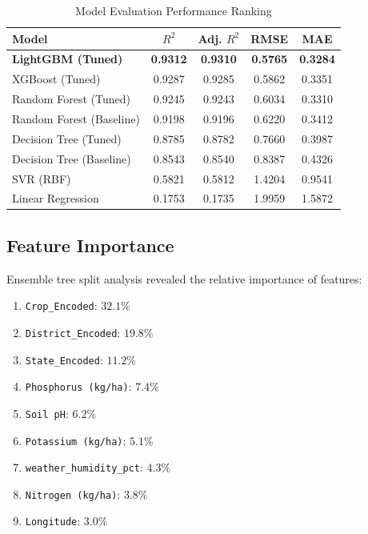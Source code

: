 \documentclass[11pt,a4paper]{article}
\begin{document}
\begin{table}[H]
\caption{Model Evaluation Performance Ranking}
\label{tab:model_rankings}
\centering
\begin{tabular}{lcccc}
\toprule
\textbf{Model} & \textbf{$R^2$} & \textbf{Adj. $R^2$} & \textbf{RMSE} & \textbf{MAE} \\
\midrule
\textbf{LightGBM (Tuned)} & \textbf{0.9312} & \textbf{0.9310} & \textbf{0.5765} & \textbf{0.3284} \\
XGBoost (Tuned) & 0.9287 & 0.9285 & 0.5862 & 0.3351 \\
Random Forest (Tuned) & 0.9245 & 0.9243 & 0.6034 & 0.3310 \\
Random Forest (Baseline) & 0.9198 & 0.9196 & 0.6220 & 0.3412 \\
Decision Tree (Tuned) & 0.8785 & 0.8782 & 0.7660 & 0.3987 \\
Decision Tree (Baseline) & 0.8543 & 0.8540 & 0.8387 & 0.4326 \\
SVR (RBF) & 0.5821 & 0.5812 & 1.4204 & 0.9541 \\
Linear Regression & 0.1753 & 0.1735 & 1.9959 & 1.5872 \\
\bottomrule
\end{tabular}
\end{table}

\subsection{Feature Importance}
Ensemble tree split analysis revealed the relative importance of features:
\begin{enumerate}
    \item \texttt{Crop\_Encoded}: $32.1\%$
    \item \texttt{District\_Encoded}: $19.8\%$
    \item \texttt{State\_Encoded}: $11.2\%$
    \item \texttt{Phosphorus (kg/ha)}: $7.4\%$
    \item \texttt{Soil pH}: $6.2\%$
    \item \texttt{Potassium (kg/ha)}: $5.1\%$
    \item \texttt{weather\_humidity\_pct}: $4.3\%$
    \item \texttt{Nitrogen (kg/ha)}: $3.8\%$
    \item \texttt{Longitude}: $3.0\%$
\end{enumerate}

\end{document}
